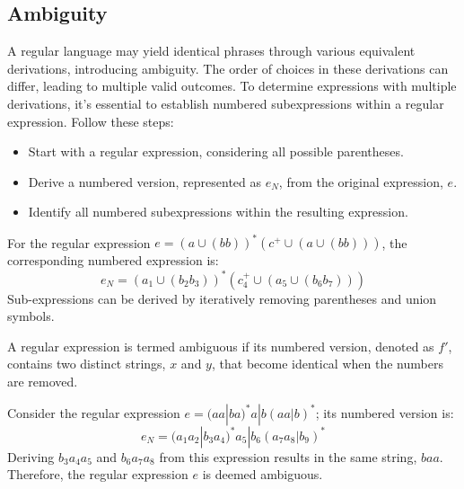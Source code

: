 \subsection{Ambiguity}
A regular language may yield identical phrases through various equivalent derivations, introducing ambiguity.
The order of choices in these derivations can differ, leading to multiple valid outcomes.
To determine expressions with multiple derivations, it's essential to establish numbered subexpressions within a regular expression. 
Follow these steps:
\begin{itemize}
    \item Start with a regular expression, considering all possible parentheses.
    \item Derive a numbered version, represented as $e_N$, from the original expression, $e$.
    \item Identify all numbered subexpressions within the resulting expression.
\end{itemize}
\begin{example}
    For the regular expression $e=(a \cup(bb))^{*}(c^{+} \cup(a\cup(bb)))$, the corresponding numbered expression is:
    \[e_N=(a_1\cup(b_2b_3))^{*}(c_4^{+} \cup(a_5\cup(b_6b_7)))\]
    Sub-expressions can be derived by iteratively removing parentheses and union symbols.
\end{example}
\begin{definition}
    A regular expression is termed ambiguous if its numbered version, denoted as $f'$, contains two distinct strings, $x$ and $y$, that become identical when the numbers are removed.
\end{definition}
\begin{example}
    Consider the regular expression $e=(aa|ba)^{*}a|b(aa|b)^{*}$; its numbered version is:
    \[e_N=(a_1a_2|b_3a_4)^{*}a_5|b_6(a_7a_8|b_9)^{*}\]
    Deriving $b_3a_4a_5$ and $b_6a_7a_8$ from this expression results in the same string, $baa$. 
    Therefore, the regular expression $e$ is deemed ambiguous.
\end{example}

